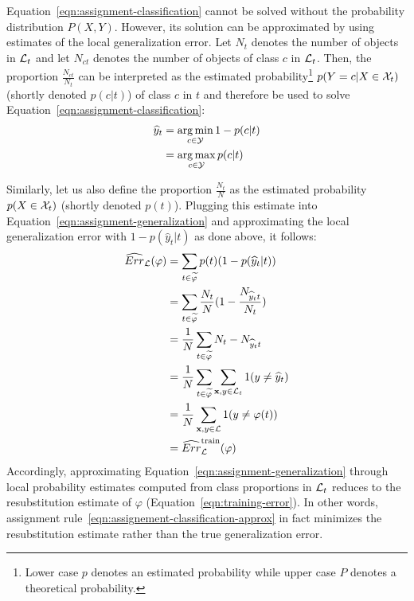 Equation~\ref{eqn:assignment-classification} cannot be solved
without the probability distribution $P(X, Y)$. However, its solution can be
approximated by using estimates of the local generalization error. Let $N_t$ denotes
the number of objects in ${\cal L}_t$ and let $N_{ct}$ denotes the number of
objects of class $c$ in ${\cal L}_t$. Then, the proportion
$\tfrac{N_{ct}}{N_t}$ can be interpreted as the estimated probability\footnote{Lower case $p$ denotes an estimated probability while upper case $P$ denotes a theoretical probability.}
$p(Y=c|X\in{\cal X}_t)$ (shortly denoted $p(c|t)$) of class $c$ in $t$ and therefore be used to solve
Equation~\ref{eqn:assignment-classification}:
\begin{align}\label{eqn:assignement-classification-approx}
\widehat{y}_t &= \operatorname*{arg\,min}_{c \in {\cal Y}} 1 - p(c | t) \nonumber \\
              &= \operatorname*{arg\,max}_{c \in {\cal Y}} p(c | t)
\end{align}

Similarly, let us also define the proportion $\tfrac{N_t}{N}$ as the estimated
probability $p(X \in {\cal X}_t)$ (shortly denoted $p(t)$). Plugging this
estimate into Equation~\ref{eqn:assignment-generalization} and approximating
the local generalization error with $1 - p(\widehat{y}_t | t)$ as done above, it follows:
\begin{align}
\widehat{Err}_{\cal L}(\varphi) &= \sum_{t \in \widetilde{\varphi}} p(t) (1 - p(\widehat{y}_t | t)) \nonumber \\
    &= \sum_{t \in \widetilde{\varphi}} \frac{N_t}{N} (1 - \frac{N_{{\widehat{y}_t}t}}{N_t}) \nonumber \\
    &= \frac{1}{N} \sum_{t \in \widetilde{\varphi}} N_t - N_{{\widehat{y}_t}t} \nonumber \\
    &= \frac{1}{N} \sum_{t \in \widetilde{\varphi}} \sum_{\mathbf{x}, y \in {\cal L}_t} 1(y \neq \widehat{y}_t) \nonumber \\
    &= \frac{1}{N} \sum_{\mathbf{x}, y \in {\cal L}} 1(y \neq \varphi(t)) \nonumber \\
    &= \widehat{Err}_{\cal L}^\text{train}(\varphi) \label{eqn:train-error-tree}
\end{align}
Accordingly, approximating Equation~\ref{eqn:assignment-generalization}
through local probability estimates computed from class proportions in
${\cal L}_t$ reduces to the resubstitution estimate of $\varphi$
(Equation~\ref{eqn:training-error}). In other words, assignment
rule~\ref{eqn:assignement-classification-approx} in fact minimizes the
resubstitution estimate rather than the true
generalization error.


